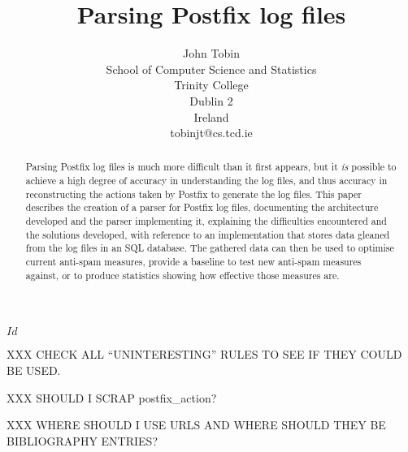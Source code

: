 \documentclass[a4paper,12pt,draft]{report}
\begin{document}
\title{Parsing Postfix log files}
\author{John Tobin \\ School of Computer Science and Statistics \\
Trinity College \\ Dublin 2 \\ Ireland \\ tobinjt@cs.tcd.ie}
\maketitle

\begin{abstract}


    Parsing Postfix log files is much more difficult than it first appears,
    but it \textit{is\/} possible to achieve a high degree of accuracy in
    understanding the log files, and thus accuracy in reconstructing the
    actions taken by Postfix to generate the log files.  This paper
    describes the creation of a parser for Postfix log files, documenting
    the architecture developed and the parser implementing it, explaining
    the difficulties encountered and the solutions developed, with
    reference to an implementation that stores data gleaned from the log
    files in an SQL database.  The gathered data can then be used to
    optimise current anti-spam measures, provide a baseline to test new
    anti-spam measures against, or to produce statistics showing how
    effective those measures are.

\end{abstract}

\SVN$Id$
\begin{center}
    \SVNId{}
\end{center}

XXX CHECK ALL ``UNINTERESTING'' RULES TO SEE IF THEY COULD BE USED\@.

XXX SHOULD I SCRAP postfix\_action?

XXX WHERE SHOULD I USE URLS AND WHERE SHOULD THEY BE BIBLIOGRAPHY
ENTRIES\@?

\newpage
\tableofcontents
\listoffigures
\listoftables

\newpage




\glsaddall[types={postfix}]


\end{document}
